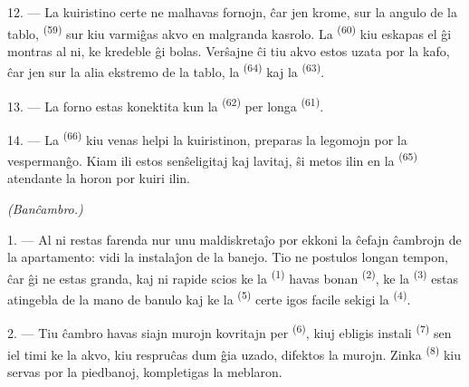 12. --- La kuiristino certe ne malhavas fornojn, ĉar jen krome, sur la angulo
de la tablo,  \textsuperscript{(59)} sur kiu varmiĝas akvo en
malgranda kasrolo. La  \textsuperscript{(60)} kiu eskapas el ĝi
montras al ni, ke kredeble ĝi bolas. Verŝajne ĉi tiu akvo estos uzata por la
kafo, ĉar jen sur la alia ekstremo de la tablo, la 
\textsuperscript{(64)} kaj la  \textsuperscript{(63)}.

13. --- La forno estas konektita kun la 
\textsuperscript{(62)} per longa 
\textsuperscript{(61)}.

14. --- La  \textsuperscript{(66)} kiu venas helpi la
kuiristinon, preparas la legomojn por la vespermanĝo. Kiam ili estos
senŝeligitaj kaj lavitaj, ŝi metos ilin en la 
\textsuperscript{(65)} atendante la horon por kuiri ilin.

\VUsaut{4.0mm}
{\centering\fontsize{10.2pt}{10.2pt}\selectfont{} \textit{(Banĉambro.)}\par}
\VUsaut{3.0mm}

1. --- Al ni restas farenda nur unu maldiskretaĵo por ekkoni la ĉefajn
ĉambrojn de la apartamento: vidi la instalaĵon de la banejo. Tio ne postulos
longan tempon, ĉar ĝi ne estas granda, kaj ni rapide scios ke la
 \textsuperscript{(1)} havas bonan 
\textsuperscript{(2)}, ke la  \textsuperscript{(3)} estas
atingebla de la mano de banulo kaj ke la 
\textsuperscript{(5)} certe igos facile sekigi la 
\textsuperscript{(4)}.

2. --- Tiu ĉambro havas siajn murojn kovritajn per 
\textsuperscript{(6)}, kiuj ebligis instali 
\textsuperscript{(7)} sen iel timi ke la akvo, kiu respruĉas dum ĝia uzado,
difektos la murojn. Zinka  \textsuperscript{(8)} kiu servas
por la piedbanoj, kompletigas la meblaron.
\VUsaut{6.0mm}
\VUfilet{22mm}
